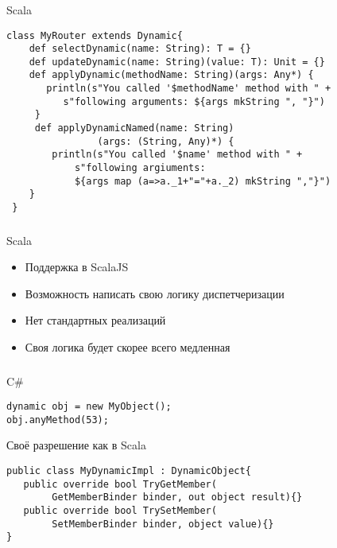 \documentclass[t]{beamer}  %
\newcommand\pro{\item[$+$]} 		%
\newcommand\con{\item[$-$]} 		%
\begin{document}
\begin{frame}[fragile]
	\frametitle{\insertsection} 
    \framesubtitle{\insertsubsection}
\begin{block}{Scala}
	\begin{verbatim}
class MyRouter extends Dynamic{
    def selectDynamic(name: String): T = {}
    def updateDynamic(name: String)(value: T): Unit = {}
    def applyDynamic(methodName: String)(args: Any*) {
       println(s"You called '$methodName' method with " +
          s"following arguments: ${args mkString ", "}")
     }
     def applyDynamicNamed(name: String)
     			(args: (String, Any)*) {
        println(s"You called '$name' method with " +
            s"following argiuments: 
            ${args map (a=>a._1+"="+a._2) mkString ","}")
    }
 }
	\end{verbatim}
\end{block}
\end{frame}

\begin{frame}[fragile]
	\frametitle{\insertsection} 
    \framesubtitle{\insertsubsection}
\begin{block}{Scala}
\begin{itemize}
        \pro Поддержка в ScalaJS
        \pro Возможность написать свою логику диспетчеризации
        \con Нет стандартных реализаций
        \con Своя логика будет скорее всего медленная
   \end{itemize}
\end{block}
\end{frame}


\begin{frame}[fragile]
	\frametitle{\insertsection} 
    \framesubtitle{\insertsubsection}
	\begin{block}{C\#}
		\begin{verbatim}
dynamic obj = new MyObject();
obj.anyMethod(53);
		\end{verbatim}
	\end{block}
   	\begin{block}{Своё разрешение как в Scala}
		\begin{verbatim}
public class MyDynamicImpl : DynamicObject{
   public override bool TryGetMember(
        GetMemberBinder binder, out object result){}
   public override bool TrySetMember(
        SetMemberBinder binder, object value){}
}
        \end{verbatim}
	\end{block}
\end{frame}
\end{document}
